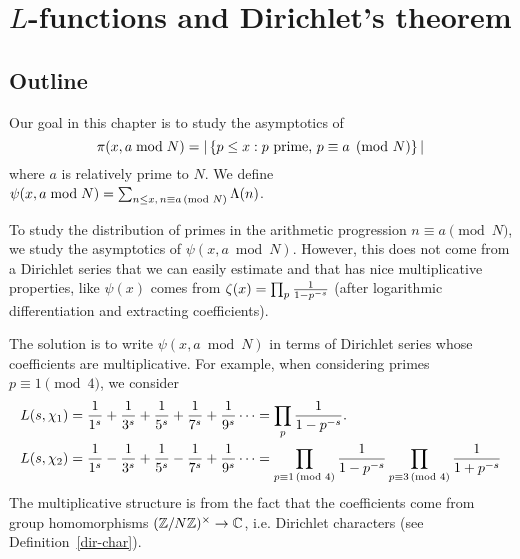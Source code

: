 \chapter{$L$-functions and Dirichlet's theorem}
\section{Outline}
Our goal in this chapter is to study the asymptotics of 
\[\pi(x,a\bmod N)
=|\left\{{p\le x}:{p\text{ prime, }p\equiv a\pmod N}\right\}|
\]
where $a$ is relatively prime to $N$. We define $\psi(x,a\bmod N)=\sum_{n\le x,\,n\equiv a\,(\text{mod }N)}\Lambda(n)$.

To study the distribution of primes in the arithmetic progression $n\equiv a\pmod N$, %
we study the asymptotics of $\psi(x,a\bmod N)$. However, this does not come from a Dirichlet series that we can easily estimate and that has nice multiplicative properties, like $\psi(x)$ comes from $\zeta(x)=\prod_p\frac{1}{1-p^{-s}}$ (after logarithmic differentiation and extracting coefficients).

The solution is to write $\psi(x,a\bmod N)$ in terms of Dirichlet series whose coefficients are multiplicative. For example, when considering primes $p\equiv 1\pmod 4$, 
we consider
\begin{align*}
L(s,\chi_1)&=\frac{1}{1^s}+\frac{1}{3^s}+\frac{1}{5^s}+\frac{1}{7^s}+\frac{1}{9^s}\cdots=\prod_{p}\frac{1}{1-p^{-s}}.\\
L(s,\chi_2)&=\frac{1}{1^s}-\frac{1}{3^s}+\frac{1}{5^s}-\frac{1}{7^s}+\frac{1}{9^s}\cdots=\prod_{p\equiv 1\,(\text{mod }4)}\frac{1}{1-p^{-s}}\prod_{p\equiv 3\,(\text{mod }4)}\frac{1}{1+p^{-s}}
\end{align*}
The multiplicative structure is from the fact that the coefficients come from group homomorphisms $(\mathbb{Z}/N\mathbb{Z})^{\times}\to \mathbb{C}$, i.e. Dirichlet characters (see Definition~\ref{dir-char}).

